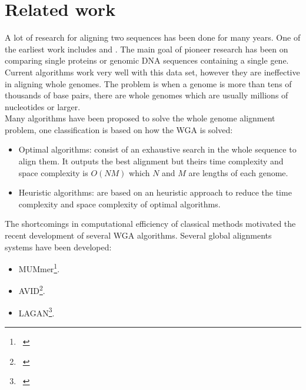 \documentclass[twocolumn,twoside]{Jornadas}
\begin{document}
\section{Related work}
A lot of research for aligning two sequences has been done for many years. One of the earliest work includes \cite{Needleman1970General} and \cite{Waterman}. The main goal of pioneer research has been on comparing single proteins or genomic DNA sequences containing a single gene. Current algorithms work very well with this data set, however they are ineffective in aligning whole genomes. The problem is when a genome is more than tens of thousands of base pairs, there are whole genomes which are usually millions of nucleotides or larger.\\
Many algorithms have been proposed to solve the whole genome alignment problem, one classification is based on how the WGA is solved:
\begin{itemize}
\item Optimal algorithms: consist of an exhaustive search in the whole sequence to align them. It outputs the best alignment but theirs time complexity and space complexity is $O(NM)$ which $N$ and $M$ are lengths of each genome.
\item Heuristic algorithms: are based on an heuristic approach to reduce the time complexity and space complexity of optimal algorithms.
\end{itemize}
The shortcomings in computational efficiency of classical methods motivated the recent development of several WGA algorithms. Several global alignments systems have been developed:
\begin{itemize}
\item MUMmer\footnote{~\cite{Mummer1,mummer2,Mummer3}}.
\item AVID\footnote{~\cite{AVID}}. %
\item LAGAN\footnote{~\cite{LAGAN}}. %
\end{itemize}
\end{document}
